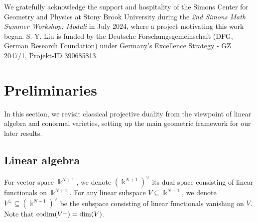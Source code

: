 \documentclass[12pt]{amsart}
\newcommand{\C}{\mathbb{C}} %
\begin{document}
We gratefully acknowledge the support and hospitality of the Simons Center for Geometry and Physics at Stony Brook University during the \textit{2nd Simons Math Summer Workshop: Moduli} in July 2024, where a project motivating this work began. S.-Y. Liu is funded by the Deutsche Forschungsgemeinschaft (DFG, German Research Foundation) under Germany's Excellence Strategy - GZ 2047/1, Projekt-ID 390685813.




\section{Preliminaries}\label{sec_prelim}
In this section, we revisit classical projective duality from the viewpoint of linear algebra and conormal varieties, setting up the main geometric framework for our later results. %



\subsection{Linear algebra}
For vector space $\Bbbk^{N+1}$, we denote $(\Bbbk^{N+1})^{\vee}$ its dual space consisting of linear functionals on $\Bbbk^{N+1}$. For any linear subspace $V\subseteq \Bbbk^{N+1}$, we denote $V^{\perp}\subseteq (\Bbbk^{N+1})^{\vee}$ be the subspace consisting of linear functionals vanishing on $V$. Note that $\textup{codim}(V^{\perp})=\dim(V)$. 
\end{document}
